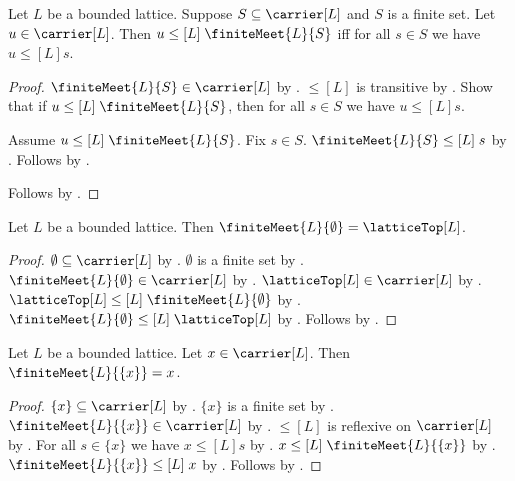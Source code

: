 \begin{proposition}\label{finite_meet_geq_iff}
    Let $L$ be a bounded lattice.
    Suppose $S\subseteq\carrier[L]$ and $S$ is a finite set.
    Let $u\in\carrier[L]$.
    Then $u\mathrel{\leq[L]}\finiteMeet{L}{S}$ iff
        for all $s\in S$ we have $u\mathrel{\leq[L]}s$.
\end{proposition}
\begin{proof}
    $\finiteMeet{L}{S}\in\carrier[L]$ by .
    $\leq[L]$ is transitive by
        .
    Show that if $u\mathrel{\leq[L]}\finiteMeet{L}{S}$, then
        for all $s\in S$ we have $u\mathrel{\leq[L]}s$.
    \begin{subproof}
        Assume $u\mathrel{\leq[L]}\finiteMeet{L}{S}$.
        Fix $s\in S$.
        $\finiteMeet{L}{S}\mathrel{\leq[L]}s$ by
            .
        Follows by .
    \end{subproof}
    Follows by .
\end{proof}

\begin{proposition}\label{finite_meet_empty}
    Let $L$ be a bounded lattice.
    Then $\finiteMeet{L}{\emptyset}=\latticeTop[L]$.
\end{proposition}
\begin{proof}
    $\emptyset\subseteq\carrier[L]$ by .
    $\emptyset$ is a finite set by .
    $\finiteMeet{L}{\emptyset}\in\carrier[L]$ by
        .
    $\latticeTop[L]\in\carrier[L]$ by .
    $\latticeTop[L]\mathrel{\leq[L]}\finiteMeet{L}{\emptyset}$ by
        .
    $\finiteMeet{L}{\emptyset}\mathrel{\leq[L]}\latticeTop[L]$ by
        .
    Follows by
        .
\end{proof}

\begin{proposition}\label{finite_meet_singleton}
    Let $L$ be a bounded lattice.
    Let $x\in\carrier[L]$.
    Then $\finiteMeet{L}{\{x\}}=x$.
\end{proposition}
\begin{proof}
    $\{x\}\subseteq\carrier[L]$ by .
    $\{x\}$ is a finite set by .
    $\finiteMeet{L}{\{x\}}\in\carrier[L]$ by
        .
    $\leq[L]$ is reflexive on $\carrier[L]$ by
        .
    For all $s\in\{x\}$ we have $x\mathrel{\leq[L]}s$ by
        .
    $x\mathrel{\leq[L]}\finiteMeet{L}{\{x\}}$ by
        .
    $\finiteMeet{L}{\{x\}}\mathrel{\leq[L]}x$ by
        .
    Follows by
        .
\end{proof}

